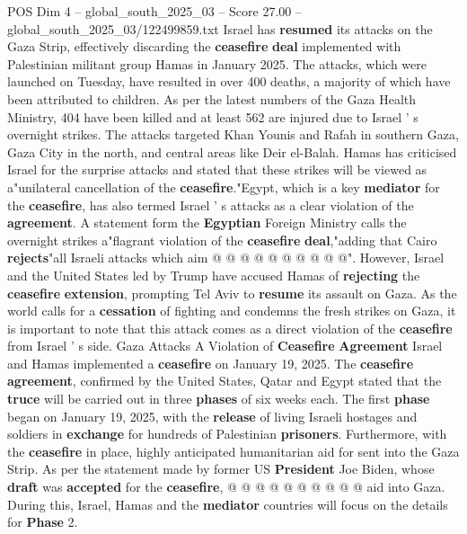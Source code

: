 \begin{textsample}{POS Dim 4 – global\_south\_2025\_03 – Score 27.00 – global\_south\_2025\_03/122499859.txt}  \label{ex:f4_pos_040}
Israel has \textbf{resumed} its attacks on the Gaza Strip, effectively discarding the \textbf{ceasefire} \textbf{deal} implemented with Palestinian militant group Hamas in January 2025.
The attacks, which were launched on Tuesday, have resulted in over 400 deaths, a majority of which have been attributed to children.
As per the latest numbers of the Gaza Health Ministry, 404 have been killed and at least 562 are injured due to Israel ' s overnight strikes.
The attacks targeted Khan Younis and Rafah in southern Gaza, Gaza City in the north, and central areas like Deir el-Balah.
Hamas has criticised Israel for the surprise attacks and stated that these strikes will be viewed as a"unilateral cancellation of the \textbf{ceasefire}."Egypt, which is a key \textbf{mediator} for the \textbf{ceasefire}, has also termed Israel ' s attacks as a clear violation of the \textbf{agreement}.
A statement form the \textbf{Egyptian} Foreign Ministry calls the overnight strikes a"flagrant violation of the \textbf{ceasefire} \textbf{deal},"adding that Cairo \textbf{rejects}"all Israeli attacks which aim @ @ @ @ @ @ @ @ @ @".
However, Israel and the United States led by Trump have accused Hamas of \textbf{rejecting} the \textbf{ceasefire} \textbf{extension}, prompting Tel Aviv to \textbf{resume} its assault on Gaza.
As the world calls for a \textbf{cessation} of fighting and condemns the fresh strikes on Gaza, it is important to note that this attack comes as a direct violation of the \textbf{ceasefire} from Israel ' s side.
Gaza Attacks A Violation of \textbf{Ceasefire} \textbf{Agreement} Israel and Hamas implemented a \textbf{ceasefire} on January 19, 2025.
The \textbf{ceasefire} \textbf{agreement}, confirmed by the United States, Qatar and Egypt stated that the \textbf{truce} will be carried out in three \textbf{phases} of six weeks each.
The first \textbf{phase} began on January 19, 2025, with the \textbf{release} of living Israeli hostages and soldiers in \textbf{exchange} for hundreds of Palestinian \textbf{prisoners}.
Furthermore, with the \textbf{ceasefire} in place, highly anticipated humanitarian aid for sent into the Gaza Strip.
As per the statement made by former US \textbf{President} Joe Biden, whose \textbf{draft} was \textbf{accepted} for the \textbf{ceasefire}, @ @ @ @ @ @ @ @ @ @ aid into Gaza.
During this, Israel, Hamas and the \textbf{mediator} countries will focus on the details for \textbf{Phase} 2.

\end{textsample}
